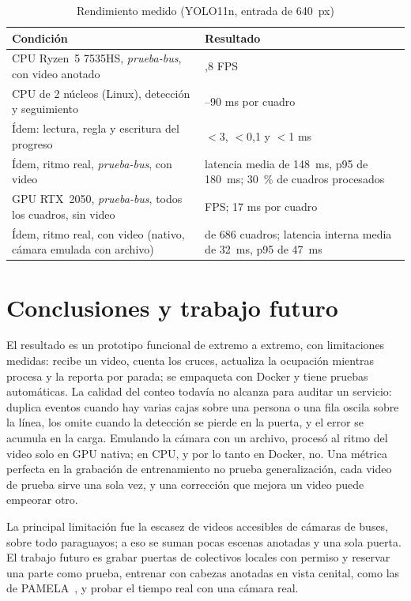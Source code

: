 \documentclass[conference,a4paper]{IEEEtran}
\begin{document}
\begin{table}[!t]
\caption{Rendimiento medido (YOLO11n, entrada de 640~px)}
\label{tab:vel}
\centering\scriptsize
\begin{tabular}{@{}>{\raggedright\arraybackslash}p{}>{\raggedright\arraybackslash}p{}@{}}
\toprule
Condición & Resultado\\
\midrule
CPU Ryzen~5 7535HS, \emph{prueba-bus}, con video anotado & 8,8 FPS\\
CPU de 2 núcleos (Linux), detección y seguimiento & 70--90 ms por cuadro\\
Ídem: lectura, regla y escritura del progreso & $<$3, $<$0,1 y $<$1 ms\\
Ídem, ritmo real, \emph{prueba-bus}, con video & latencia media de 148~ms, p95 de 180~ms; 30~\% de cuadros procesados\\
GPU RTX~2050, \emph{prueba-bus}, todos los cuadros, sin video & 58 FPS; 17 ms por cuadro\\
Ídem, ritmo real, con video (nativo, cámara emulada con archivo) & 680 de 686 cuadros; latencia interna media de 32~ms, p95 de 47~ms\\
\bottomrule
\end{tabular}
\end{table}

\section{Conclusiones y trabajo futuro}
El resultado es un prototipo funcional de extremo a extremo, con limitaciones medidas: recibe un video, cuenta los cruces, actualiza la ocupación mientras procesa y la reporta por parada; se empaqueta con Docker y tiene pruebas automáticas. La calidad del conteo todavía no alcanza para auditar un servicio: duplica eventos cuando hay varias cajas sobre una persona o una fila oscila sobre la línea, los omite cuando la detección se pierde en la puerta, y el error se acumula en la carga. Emulando la cámara con un archivo, procesó al ritmo del video solo en GPU nativa; en CPU, y por lo tanto en Docker, no. Una métrica perfecta en la grabación de entrenamiento no prueba generalización, cada video de prueba sirve una sola vez, y una corrección que mejora un video puede empeorar otro.

La principal limitación fue la escasez de videos accesibles de cámaras de buses, sobre todo paraguayos; a eso se suman pocas escenas anotadas y una sola puerta. El trabajo futuro es grabar puertas de colectivos locales con permiso y reservar una parte como prueba, entrenar con cabezas anotadas en vista cenital, como las de PAMELA~\cite{velastin2020}, y probar el tiempo real con una cámara real.



\end{document}
